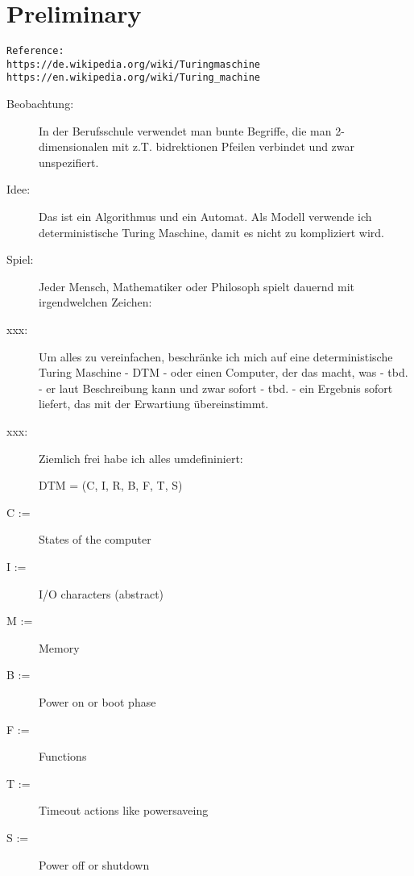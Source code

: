 \documentclass[10pt,a4paper]{article}
\begin{document}
\section {Preliminary}

\begin{verbatim}
Reference:
https://de.wikipedia.org/wiki/Turingmaschine
https://en.wikipedia.org/wiki/Turing_machine
\end{verbatim}

\begin{description}
  
\item[Beobachtung:]
In der Berufsschule verwendet man bunte Begriffe, die man
2-dimensionalen mit z.T. bidrektionen Pfeilen verbindet und
zwar unspezifiert.

\item[Idee:]
Das ist ein Algorithmus und ein Automat.
Als Modell verwende ich deterministische Turing Maschine,
damit es nicht zu kompliziert wird.

\item[Spiel:]
Jeder Mensch, Mathematiker oder Philosoph spielt dauernd mit irgendwelchen Zeichen:

\item[xxx: ]
Um alles zu vereinfachen, beschränke ich mich auf eine
deterministische Turing Maschine - DTM - oder einen Computer, der das macht,
was - tbd. - er laut Beschreibung kann und zwar sofort - tbd. - ein Ergebnis
sofort liefert, das mit der Erwartiung übereinstimmt.

\item[xxx: ]
Ziemlich frei habe ich alles umdefininiert:

DTM = (C, I, R, B, F, T, S)
\end{description}
  
\begin{description}
\item[C := ] States of the computer
\item[I := ] I/O characters (abstract)
\item[M := ] Memory
\item[B := ] Power on or boot phase
\item[F := ] Functions
\item[T := ] Timeout actions like powersaveing
\item[S := ] Power off or shutdown
\end{description}

\vskip 20pt
\end{document}
